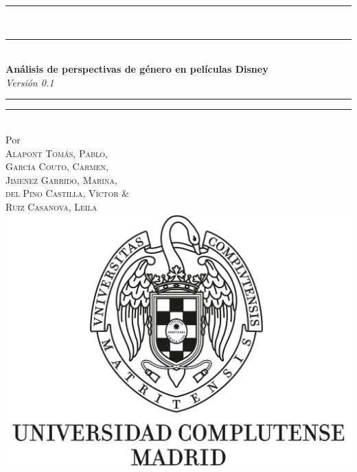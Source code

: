 %
%
% 
%




\thispagestyle{empty}
\vspace*{9mm}
\begin{center}
\vspace{-1cm}
    \rule[0.5ex]{\linewidth}{2pt}\vspace*{-\baselineskip}\vspace*{3.2pt}\\
    \rule[0.5ex]{\linewidth}{2pt}\\
    {\textbf{\Large{Análisis de perspectivas de género en películas Disney}} }\\[4mm] %
    {\Large \textit{Versión 0.1}}\\ %
    \rule[0.5ex]{\linewidth}{1pt}\vspace*{-\baselineskip}\vspace{3.2pt}
    \rule[0.5ex]{\linewidth}{2pt}\\
    \vspace{6.5mm}
    {\large Por}\\ 
    \vspace{6.5mm}
    {
        \large{\textsc{Alapont Tomás, Pablo}},\\
        \large{\textsc{García Couto, Carmen}},\\
        \large{\textsc{Jimenez Garrido, Marina}},\\
        \large{\textsc{del Pino Castilla, Víctor}} \& \\
        \large{\textsc{Ruiz Casanova, Leila}}
    }\\ %
    \vspace{11mm}
    \includegraphics[scale=0.3]{Images/logo_UCM.jpg}\\ %

\end{center}
